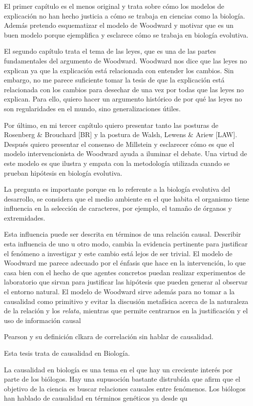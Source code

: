 El primer capítulo es el menos original y trata sobre cómo los modelos de explicación no han hecho justicia a cómo se trabaja en ciencias como la biología. Además pretendo esquematizar el modelo de Woodward y motivar que es un buen modelo porque ejemplifica y esclarece cómo se trabaja en biología evolutiva.

El segundo capítulo trata el tema de las leyes, que es una de las partes fundamentales del argumento de Woodward. Woodward nos dice que las leyes no explican ya que la explicación está relacionada con entender los cambios. Sin embargo, no me parece suficiente tomar la tesis de que la explicación está relacionada con los cambios para desechar de una vez por todas que las leyes no explican. Para ello, quiero hacer un argumento histórico de por qué las leyes no son regularidades en el mundo, sino generalizaciones útiles.

Por último, en mi tercer capítulo quiero presentar tanto las posturas de Rosenberg \& Brouchard [BR] y la postura de Walsh, Lewens \& Ariew [LAW]. Después quiero presentar el consenso de Millstein y esclarecer cómo es que el modelo intervencionista de Woodward ayuda a iluminar el debate. Una virtud de este modelo  es que ilustra y empata con la metodología utilizada cuando se prueban hipótesis en biología evolutiva.

La pregunta es importante porque en lo referente a la biología evolutiva del desarrollo, se considera que el medio ambiente en el que habita el organismo tiene influencia en la selección de caracteres, por ejemplo, el tamaño de órganos y extremidades.

Esta influencia puede ser descrita en términos de una relación causal. Describir esta influencia de uno u otro modo, cambia la evidencia pertinente para justificar el fenómeno a investigar y este cambio está lejos de ser trivial. El modelo de Woodward me parece adecuado por el énfasis que hace en la intervención, lo que casa bien con el hecho de que agentes concretos puedan realizar experimentos de laboratorio que sirvan para justificar las hipótesis que pueden generar al observar el entorno
natural. El modelo de Woodward sirve además para no tomar a la causalidad como primitivo y evitar la discusión metafísica acerca de la naturaleza de la relación y los \emph{relata}, mientras que permite
centrarnos en la justificación y el uso de información causal

Pearson y su definición clkara de correlación sin hablar de causalidad.

Esta tesis trata de causalidad en Biología.



La causalidad en biología es una tema en el que hay un creciente interés por parte de los biólogos. Hay una supusoción bastante distrubída que afirm que el objetivo de la ciencia es buscar relaciones causales entre fenómenos. Los biólogos han hablado de causalidad en términos genéticos ya desde qu



